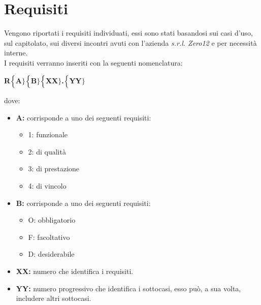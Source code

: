 \chapter{Requisiti}
Vengono riportati i requisiti individuati, essi sono stati basandosi sui casi d'uso, sul capitolato, sui diversi incontri avuti con l'azienda \textit{s.r.l. Zero12} e per necessità interne. \\
I requisiti verranno inseriti con la seguenti nomenclatura:
\begin{center}
	\textbf{R$\Bigl\{$A$\Bigr\}$$\Bigl\{$B$\Bigr\}$$\Bigl\{$XX$\Bigr\}$.$\Bigl\{$YY$\Bigr\}$}
\end{center}
dove:
\begin{itemize}
	\item \textbf{A:} corrisponde a uno dei seguenti requisiti:
	\begin{itemize}
		\item 1: funzionale
		\item 2: di qualità
		\item 3: di prestazione
		\item 4: di vincolo
	\end{itemize}
	\item \textbf{B:} corrisponde a uno dei seguenti requisiti:
	\begin{itemize}
		\item O: obbligatorio
		\item F: facoltativo
		\item D: desiderabile
	\end{itemize}
	\item \textbf{{XX}:} numero che identifica i requisiti.
	\item \textbf{{YY}:} numero progressivo che identifica i sottocasi, esso può, a sua volta, includere altri sottocasi.
\end{itemize}

\newpage
